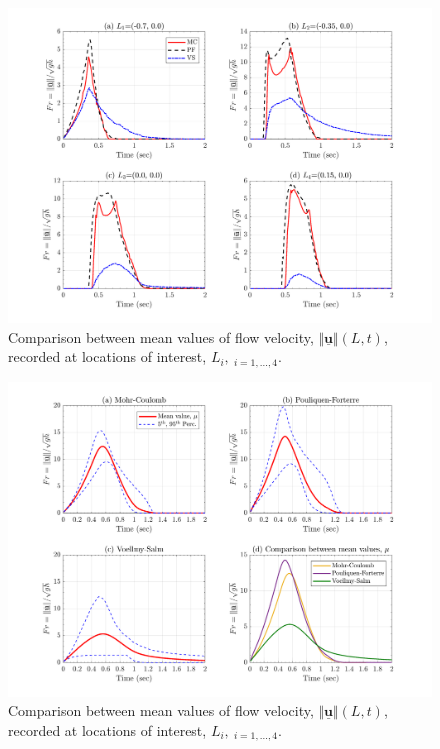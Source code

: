 \documentclass{article}
\begin{document}
\begin{figure}[H]
        \centering
        \includegraphics[width=1\textwidth]{InclinedPlane/Froude/Fr_mean.png}
        \caption{Comparison between mean values of flow velocity, $\Vert \underline{\mathbf{u}} \Vert(L,t)$, recorded at locations of interest, $L_i, \ _{i=1,...,4}$.}
        \label{fig:Ramp-LM-Fr-means}
\end{figure}

\begin{figure}[H]
        \centering
        \includegraphics[width=1\textwidth]{InclinedPlane/Froude/Fr_SpatialRec.png}
        \caption{Comparison between mean values of flow velocity, $\Vert \underline{\mathbf{u}} \Vert(L,t)$, recorded at locations of interest, $L_i, \ _{i=1,...,4}$.}
        \label{fig:Ramp-Fr-spatial}
\end{figure}
\end{document}

